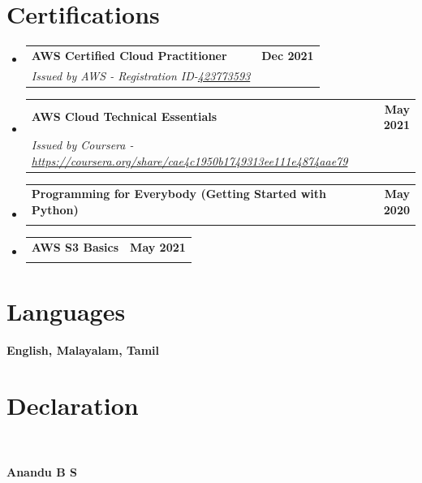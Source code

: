 \documentclass[letterpaper,11pt]{article}
\makeatletter
\newcommand{\resumeSubheading}[4]{
  \vspace{-2pt}\item
    \begin{tabular*}{1.0\textwidth}[t]{l@{\extracolsep{\fill}}r}
      \textbf{#1} & \textbf{\small #2} \\
      \textit{\small#3} & \textit{\small #4} \\
    \end{tabular*}\vspace{-11pt}
}
\newcommand{\resumeSubHeadingListStart}{\begin{itemize}[leftmargin=0.0in, label={}]}
\newcommand{\resumeSubHeadingListEnd}{\end{itemize}}
\makeatother
\begin{document}
 \section{Certifications}
 \resumeSubHeadingListStart
    \resumeSubheading
      {AWS Certified Cloud Practitioner }{Dec 2021}
      {Issued by AWS - Registration ID-\href{https://anandubs-resume.netlify.app/AWS\%20Certified\%20Cloud\%20Practitioner.pdf}{423773593} }{}
  \resumeSubHeadingListEnd
  \resumeSubHeadingListStart
    \resumeSubheading
      {AWS Cloud Technical Essentials}{May 2021}
      {Issued by Coursera  - \href{https://coursera.org/share/cae4c1950b1749313ee111e4874aae79}{https://coursera.org/share/cae4c1950b1749313ee111e4874aae79}}{}
  \resumeSubHeadingListEnd
  \resumeSubHeadingListStart
    \resumeSubheading
      {Programming for Everybody (Getting Started with Python)}{May 2020}
      {Issued by Coursera - https://coursera.org/share/982a69546fb228fa2817817b24c83175\href{https://coursera.org/share/982a69546fb228fa2817817b24c83175} }{}
  \resumeSubHeadingListEnd
   \resumeSubHeadingListStart
    \resumeSubheading
      {AWS S3 Basics }{May 2021}
      {Issued by Coursera - https://coursera.org/share/ec46f202d3ac0d862cf688fdff599a5d\href{https://coursera.org/share/ec46f202d3ac0d862cf688fdff599a5d} }{}
  \resumeSubHeadingListEnd
  
%

\section{Languages}
 \begin{itemize}[leftmargin=0.15in, label={}]
    \small{\item{
    
     \textbf{English, Malayalam, Tamil}  \\
     \vspace{2pt}
       
    }}
 \end{itemize}

\section{Declaration}
 \begin{itemize}[leftmargin=0.15in, label={}]
    \small{\item{
    
       \\
     \begin{flushright}
        \textbf{Anandu B S}
     
     \end{flushright}
     \vspace{2pt}
       
    }}
 \end{itemize}

 
\end{document}
